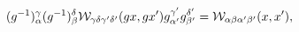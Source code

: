 \begin{equation}
(g^{-1})^{\gamma}_{\alpha}(g^{-1})^{\delta}_{\beta} {\cal
W}_{\gamma\delta \gamma'\delta'} (g x,g x')g^{\gamma'}_{\alpha'}
g^{\delta'}_{\beta'}= {\cal W}_{\alpha\beta \alpha'\beta'}(x,x'),
\end{equation}


